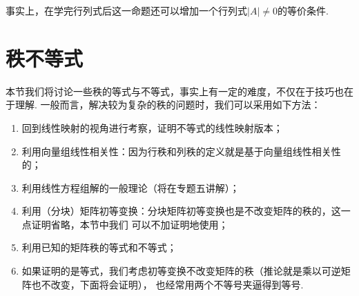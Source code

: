 事实上，在学完行列式后这一命题还可以增加一个行列式$|A|\neq 0$的等价条件.

\section{秩不等式}
本节我们将讨论一些秩的等式与不等式，事实上有一定的难度，不仅在于技巧也在于理解.
一般而言，解决较为复杂的秩的问题时，我们可以采用如下方法：
\begin{enumerate}
    \item 回到线性映射的视角进行考察，证明不等式的线性映射版本；
    \item 利用向量组线性相关性：因为行秩和列秩的定义就是基于向量组线性相关性的；
    \item 利用线性方程组解的一般理论（将在专题五讲解）；
    \item 利用（分块）矩阵初等变换：分块矩阵初等变换也是不改变矩阵的秩的，这一点证明省略，本节中我们
    可以不加证明地使用；
    \item 利用已知的矩阵秩的等式和不等式；
    \item 如果证明的是等式，我们考虑初等变换不改变矩阵的秩（推论就是乘以可逆矩阵也不改变，下面将会证明），
    也经常用两个不等号夹逼得到等号.
\end{enumerate}


